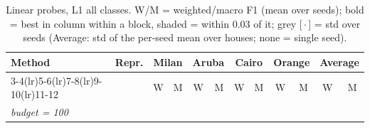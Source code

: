 \begin{table}[H]
\centering\small
\caption{Linear probes, L1 all classes. W/M = weighted/macro F1 (mean over seeds); bold = best in column within a block, shaded = within 0.03 of it; grey [\,$\cdot$\,] = std over seeds (Average: std of the per-seed mean over houses; none = single seed).}
\label{tab:probe_l1_all}
\setlength{\tabcolsep}{3.2pt}
\begin{tabular}{llcc|cc|cc|cc|cc}
\toprule
Method & Repr. & \multicolumn{2}{c}{Milan} & \multicolumn{2}{c}{Aruba} & \multicolumn{2}{c}{Cairo} & \multicolumn{2}{c}{Orange} & \multicolumn{2}{c}{Average} \\
\cmidrule(lr){3-4}\cmidrule(lr){5-6}\cmidrule(lr){7-8}\cmidrule(lr){9-10}\cmidrule(lr){11-12}
 & & W & M & W & M & W & M & W & M & W & M \\
\midrule
\multicolumn{12}{l}{\textit{budget = 100}} \\
\midrule

\end{tabular}
\end{table}
